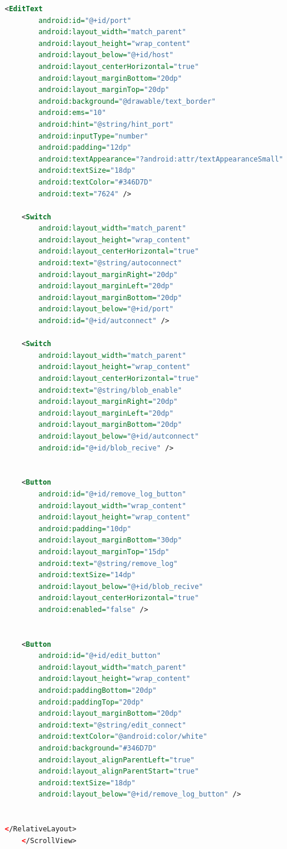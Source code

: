 \begin{lstlisting}[language=XML,caption={Vista de edición  XML de una propiedad},label={lst:xml_edit_view}]
    <EditText
        android:id="@+id/port"
        android:layout_width="match_parent"
        android:layout_height="wrap_content"
        android:layout_below="@+id/host"
        android:layout_centerHorizontal="true"
        android:layout_marginBottom="20dp"
        android:layout_marginTop="20dp"
        android:background="@drawable/text_border"
        android:ems="10"
        android:hint="@string/hint_port"
        android:inputType="number"
        android:padding="12dp"
        android:textAppearance="?android:attr/textAppearanceSmall"
        android:textSize="18dp"
        android:textColor="#346D7D"
        android:text="7624" />

    <Switch
        android:layout_width="match_parent"
        android:layout_height="wrap_content"
        android:layout_centerHorizontal="true"
        android:text="@string/autoconnect"
        android:layout_marginRight="20dp"
        android:layout_marginLeft="20dp"
        android:layout_marginBottom="20dp"
        android:layout_below="@+id/port"
        android:id="@+id/autconnect" />

    <Switch
        android:layout_width="match_parent"
        android:layout_height="wrap_content"
        android:layout_centerHorizontal="true"
        android:text="@string/blob_enable"
        android:layout_marginRight="20dp"
        android:layout_marginLeft="20dp"
        android:layout_marginBottom="20dp"
        android:layout_below="@+id/autconnect"
        android:id="@+id/blob_recive" />


    <Button
        android:id="@+id/remove_log_button"
        android:layout_width="wrap_content"
        android:layout_height="wrap_content"
        android:padding="10dp"
        android:layout_marginBottom="30dp"
        android:layout_marginTop="15dp"
        android:text="@string/remove_log"
        android:textSize="14dp"
        android:layout_below="@+id/blob_recive"
        android:layout_centerHorizontal="true"
        android:enabled="false" />


    <Button
        android:id="@+id/edit_button"
        android:layout_width="match_parent"
        android:layout_height="wrap_content"
        android:paddingBottom="20dp"
        android:paddingTop="20dp"
        android:layout_marginBottom="20dp"
        android:text="@string/edit_connect"
        android:textColor="@android:color/white"
        android:background="#346D7D"
        android:layout_alignParentLeft="true"
        android:layout_alignParentStart="true"
        android:textSize="18dp"
        android:layout_below="@+id/remove_log_button" />


</RelativeLayout>
    </ScrollView>

\end{lstlisting}


